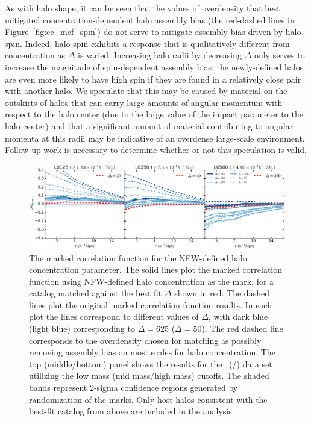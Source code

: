 \documentclass[usenatbib,fleqn]{mnras}
\begin{document}
As with halo shape, it can be seen that the values of overdensity that best mitigated concentration-dependent halo assembly bias (the red-dashed lines in Figure~\ref{fig:cc_mcf_spin}) do not serve to mitigate assembly bias driven by halo spin. Indeed, halo spin exhibits a response that is qualitatively different from concentration as $\Delta$ is varied. Increasing halo radii by decreasing $\Delta$ only serves to increase the magnitude of spin-dependent assembly bias; the newly-defined halos are even more likely to have high spin if they are found in a relatively close pair with another halo. We speculate that this may be caused by material on the outskirts of halos that can carry large amounts of angular momentum with respect to the halo center (due to the large value of the impact parameter to the halo center) and that a significant amount of material contributing to angular momenta at this radii may be indicative of an overdense large-scale environment. Follow up work is necessary to determine whether or not this speculation is valid.

\begin{figure}
	\centering
	\includegraphics[width=\textwidth]{match_mcf_cNFW.pdf}
	\caption{The marked correlation function for the NFW-defined halo concentration parameter. The solid lines plot the marked correlation function using NFW-defined halo concentration as the mark, for a catalog matched against the best fit $\Delta$ shown in red. The dashed lines plot the original marked correlation function results. In each plot the lines correspond to different values of $\Delta$, with dark blue (light blue) corresponding to $\Delta = 625$ ($\Delta = 50$). The red dashed line corresponds to the overdensity chosen for matching as possibly removing assembly bias on most scales for halo concentration. The top (middle/bottom) panel shows the results for the
\simA \ (\simB /\simC) data set utilizing the low mass (mid mass/high mass) cutoffs. The shaded bands represent 2-sigma confidence regions generated by randomization of the marks. Only host halos consistent with the best-fit catalog from above are included in the analysis.}
	\label{fig:hvm_mcf_cnfw}
\end{figure}
\end{document}
